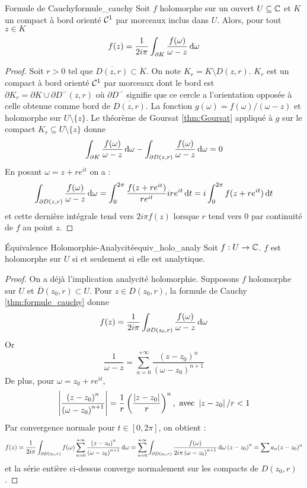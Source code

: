 \documentclass{cours}
\begin{document}
\begin{théorème}{Formule de Cauchy}{formule_cauchy}
    Soit $f$ holomorphe sur un ouvert $U \subseteq \mathbb{C}$ et $K$ un compact à bord orienté $\mathcal{C}^{1}$ par morceaux inclus dans $U$. Alors, pour tout $z \in K$ 
    \[
        f(z) = \frac{1}{2i\pi}\int_{\partial K}\frac{f(\omega)}{\omega -  z}{\rm \, d} \omega
    \]
\end{théorème}
\begin{proof}
    Soit $r > 0$ tel que $\overline{D(z, r)} \subset \mathring{K}$. On note $K_{r} = K \setminus D(z, r)$. $K_{r}$ est un compact à bord orienté $\mathcal{C}^{1}$ par morceaux dont le bord est $\partial K_{r} = \partial K \cup \partial D^{-}(z, r)$ où $\partial D^{-}$ signifie que ce cercle a l'orientation opposée à celle obtenue comme bord de $\overline{D(z,r)}$. La fonction $g(\omega) = f(\omega)/\left(\omega - z\right)$ et holomorphe sur $U \setminus \{z\}$. Le théorème de Goursat \ref{thm:Goursat} appliqué à $g$ sur le compact $K_{r} \subseteq U \setminus \{z\}$ donne 
    \[
        \int_{\partial K}\frac{f(\omega)}{\omega - z}{\rm \, d} \omega - \int_{\partial D(z, r)} \frac{f(\omega)}{\omega - z}{\rm \, d} \omega = 0
    \]
    En posant $\omega = z + re^{it}$ on a : 
    \[
        \int_{\partial D(z, r)}\frac{f(\omega)}{\omega - z}{\rm \, d} \omega = \int_{0}^{2\pi}\frac{f(z + re^{it})}{re^{it}}ire^{it}{\rm \, d} t = i \int_{0}^{2\pi}f(z + re^{it}) {\rm \, d} t
    \]
    et cette dernière intégrale tend vers $2i\pi f(z)$ lorsque $r$ tend vers $0$ par continuité de $f$ au point $z$. 
\end{proof}
\begin{théorème}{Équivalence Holomorphie-Analycité}{equiv_holo_analy}
    Soit $f : U \to \mathbb{C}$. $f$ est holomorphe sur $U$ si et seulement si elle est analytique.
\end{théorème}
\begin{proof}
    On a déjà l'implication analycité holomorphie. Supposons $f$ holomorphe sur $U$ et $\overline{D}(z_{0}, r) \subset U$. Pour $z \in D(z_{0}, r)$, la formule de Cauchy \ref{thm:formule_cauchy} donne 
    \[
        f(z) = \frac{1}{2i\pi}\int_{\partial D(z_{0}, r)}\frac{f(\omega)}{\omega - z}{\rm \, d} \omega
    \]
    Or 
    \[
        \frac{1}{\omega - z} = \sum_{n = 0}^{+ \infty}\frac{\left(z - z_{0}\right)^{n}}{\left(\omega - z_{0}\right)^{n + 1}}
    \]
    De plus, pour $\omega = z_{0} + re^{it}$,
    \[
        \left|\frac{\left(z - z_{0}\right)^{n}}{\left(\omega - z_{0}\right)^{n + 1}}\right| = \frac{1}{r}\left(\frac{\left|z - z_{0}\right|}{r}\right)^{n}, \text{ avec } \left|z - z_{0}\right|/r < 1
    \]
    Par convergence normale pour $t \in [0, 2\pi]$, on obtient :
    \[
        f(z) = \frac{1}{2i\pi}\int_{\partial D(z_{0},r )}f(\omega)\sum_{n = 0}^{+ \infty}\frac{\left(z - z_{0}\right)^{n}}{\left(\omega - z_{0}\right)^{n + 1}}{\rm \, d} \omega = \sum_{n = 0}^{+ \infty}\int_{\partial D(z_{0}, r)}\frac{f(\omega)}{2i\pi\left(\omega - z_{0}\right)^{n + 1}}{\rm \, d} \omega\left(z - z_{0}\right)^{n} = \sum a_{n}(z - z_{0})^{n}
    \]
    et la série entière ci-dessus converge normalement sur les compacts de $D(z_{0}, r)$.
\end{proof}
\end{document}
